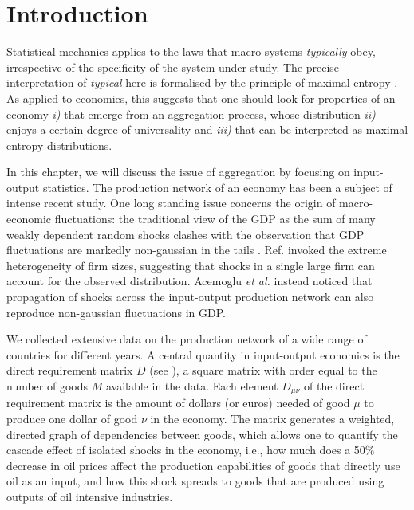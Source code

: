 

\section{Introduction}

Statistical mechanics applies to the laws that macro-systems {\em
  typically} obey, irrespective of the specificity of the system under
study. The precise interpretation of {\em typical} here is formalised
by the principle of maximal entropy \cite{Jaynes57}. As applied to economies, 
this suggests that one
should look for properties of an economy {\em i)} that emerge from an
aggregation process, whose distribution {\em ii)} enjoys a certain
degree of universality and {\em iii)} that can be interpreted as
maximal entropy distributions.

In this chapter, we will discuss the issue of aggregation by focusing on
input-output statistics. The production network of an economy has been
a subject of intense recent study. One long standing issue concerns
the origin of macro-economic fluctuations: the traditional view of the
GDP as the sum of many weakly dependent random shocks clashes with the
observation that GDP fluctuations are markedly non-gaussian in the
tails \cite{non-gaussGDP}. Ref. \cite{Gabaix} invoked the extreme
heterogeneity of firm sizes, suggesting that shocks in a single large
firm can account for the observed distribution.  Acemoglu {\em et al.}
\cite{Acemoglu12} instead noticed that propagation of shocks across
the input-output production network can also reproduce non-gaussian
fluctuations in GDP.

We collected extensive data on the production network of a wide range
of countries for different years.  A central quantity in input-output
economics is the direct requirement matrix $D$ (see \cite{Acemoglu12,BEA_handbook}), a square matrix with order equal to the number of
goods $M$ available in the data. Each element $D_{\mu\nu}$ of the
direct requirement matrix is the amount of dollars (or euros) needed
of good $\mu$ to produce one dollar of good $\nu$ in the economy. The
matrix generates a weighted, directed graph of dependencies between
goods, which allows one to quantify the cascade effect of isolated
shocks in the economy, i.e., how much does a 50\% decrease in oil
prices affect the production capabilities of goods that directly use
oil as an input, and how this shock spreads to goods that are produced
using outputs of oil intensive industries.

